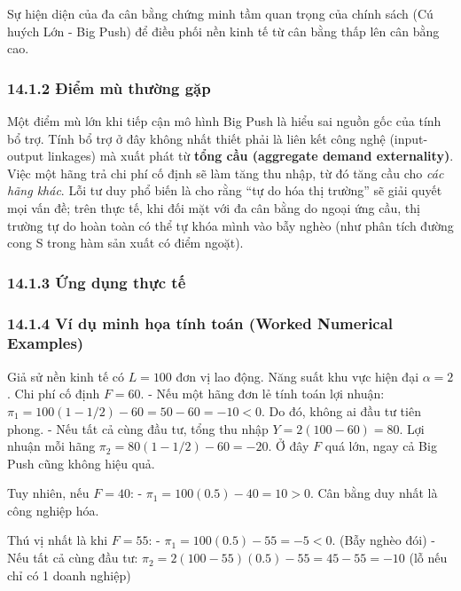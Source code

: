 \documentclass[
]{article}
\begin{document}
Sự hiện diện của đa cân bằng chứng minh tầm quan trọng của chính sách
(Cú huých Lớn - Big Push) để điều phối nền kinh tế từ cân bằng thấp lên
cân bằng cao.

\subsubsection{14.1.2 Điểm mù thường
gặp}\label{ux111iux1ec3m-muxf9-thux1b0ux1eddng-gux1eb7p-6}

Một điểm mù lớn khi tiếp cận mô hình Big Push là hiểu sai nguồn gốc của
tính bổ trợ. Tính bổ trợ ở đây không nhất thiết phải là liên kết công
nghệ (input-output linkages) mà xuất phát từ \textbf{tổng cầu (aggregate
demand externality)}. Việc một hãng trả chi phí cố định sẽ làm tăng thu
nhập, từ đó tăng cầu cho \emph{các hãng khác}. Lỗi tư duy phổ biến là
cho rằng ``tự do hóa thị trường'' sẽ giải quyết mọi vấn đề; trên thực
tế, khi đối mặt với đa cân bằng do ngoại ứng cầu, thị trường tự do hoàn
toàn có thể tự khóa mình vào bẫy nghèo (như phân tích đường cong S trong
hàm sản xuất có điểm ngoặt).

\subsubsection{14.1.3 Ứng dụng thực
tế}\label{ux1ee9ng-dux1ee5ng-thux1ef1c-tux1ebf}

\subsubsection{14.1.4 Ví dụ minh họa tính toán (Worked Numerical
Examples)}\label{vuxed-dux1ee5-minh-hux1ecda-tuxednh-touxe1n-worked-numerical-examples-38}

Giả sử nền kinh tế có \(L = 100\) đơn vị lao động. Năng suất khu vực
hiện đại \(\alpha = 2\). Chi phí cố định \(F = 60\). - Nếu một hãng đơn
lẻ tính toán lợi nhuận:
\(\pi_1 = 100(1 - 1/2) - 60 = 50 - 60 = -10 < 0\). Do đó, không ai đầu
tư tiên phong. - Nếu tất cả cùng đầu tư, tổng thu nhập
\(Y = 2(100 - 60) = 80\). Lợi nhuận mỗi hãng
\(\pi_2 = 80(1 - 1/2) - 60 = -20\). Ở đây \(F\) quá lớn, ngay cả Big
Push cũng không hiệu quả.

Tuy nhiên, nếu \(F = 40\): - \(\pi_1 = 100(0.5) - 40 = 10 > 0\). Cân
bằng duy nhất là công nghiệp hóa.

Thú vị nhất là khi \(F = 55\): - \(\pi_1 = 100(0.5) - 55 = -5 < 0\).
(Bẫy nghèo đói) - Nếu tất cả cùng đầu tư:
\(\pi_2 = 2(100 - 55)(0.5) - 55 = 45 - 55 = -10\) (lỗ nếu chỉ có 1 doanh
nghiệp)
\end{document}
